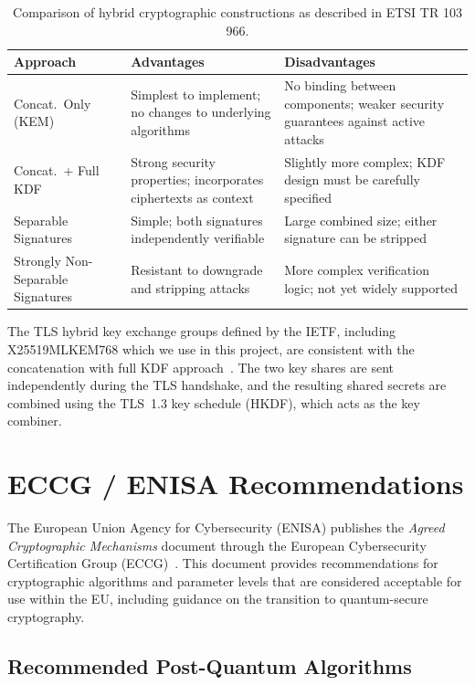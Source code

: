 \documentclass[11pt,a4paper]{article}
\begin{document}
\begin{table}[h]
\centering
\small
\begin{tabular}{p{3.2cm}p{5cm}p{5cm}}
\toprule
\textbf{Approach} & \textbf{Advantages} & \textbf{Disadvantages} \\
\midrule
Concat.~Only (KEM) &
Simplest to implement; no changes to underlying algorithms &
No binding between components; weaker security guarantees against active attacks \\
\addlinespace
Concat.~+ Full KDF &
Strong security properties; incorporates ciphertexts as context &
Slightly more complex; KDF design must be carefully specified \\
\addlinespace
Separable Signatures &
Simple; both signatures independently verifiable &
Large combined size; either signature can be stripped \\
\addlinespace
Strongly Non-Separable Signatures &
Resistant to downgrade and stripping attacks &
More complex verification logic; not yet widely supported \\
\bottomrule
\end{tabular}
\caption{Comparison of hybrid cryptographic constructions as described in ETSI TR 103 966.}
\label{tab:etsi-comparison}
\end{table}

The TLS hybrid key exchange groups defined by the IETF, including X25519MLKEM768 which we use in this project, are consistent with the concatenation with full KDF approach~\cite{hybrid-ietf}. The two key shares are sent independently during the TLS handshake, and the resulting shared secrets are combined using the TLS~1.3 key schedule (HKDF), which acts as the key combiner.

\section{ECCG / ENISA Recommendations}

The European Union Agency for Cybersecurity (ENISA) publishes the \emph{Agreed Cryptographic Mechanisms} document through the European Cybersecurity Certification Group (ECCG)~\cite{enisa}. This document provides recommendations for cryptographic algorithms and parameter levels that are considered acceptable for use within the EU, including guidance on the transition to quantum-secure cryptography.

\subsection{Recommended Post-Quantum Algorithms}
\end{document}
